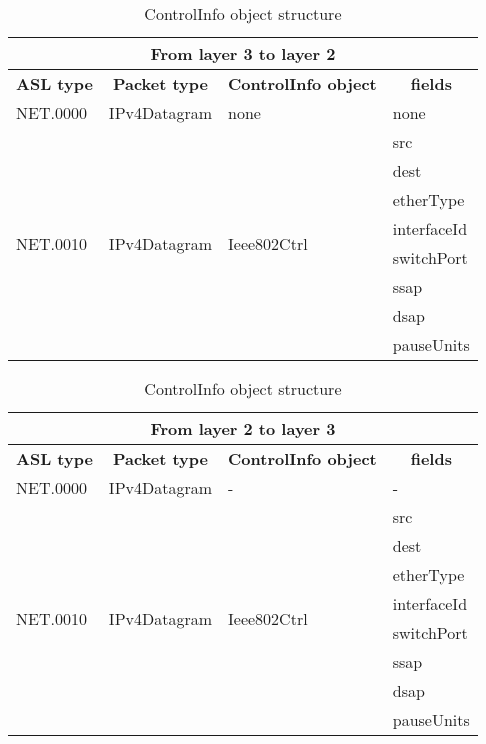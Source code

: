 \begin{table}
\centering
\ttfamily
\footnotesize
\caption{ControlInfo object structure}
\label{tab:from4-to5}
\begin{tabular}{|l|l|l|l|}
\hline
\multicolumn{4}{|c|}{\normalfont\textbf{From layer 3 to layer 2}}	\\
\hline
\multicolumn{1}{|c|}{\normalfont\textbf{ASL type}}	&\multicolumn{1}{c|}{\normalfont\textbf{Packet type}}	&\multicolumn{1}{c|}{\normalfont\textbf{ControlInfo object}}		&\multicolumn{1}{c|}{\normalfont\textbf{fields}}\\
\hline
\multirow{1}{*}{NET.0000}&\multirow{1}{*}{IPv4Datagram}		&none	&none	\\
\hline
\multirow{8}{*}{NET.0010}&\multirow{8}{*}{IPv4Datagram}		&\multirow{8}{*}{Ieee802Ctrl}	&src			\\
												&						&									&dest		\\
												&					&									&etherType	\\
												&					&									&interfaceId	\\
												&					&									&switchPort	\\
												&					&									&ssap		\\
												&					&									&dsap		\\
												&					&									&pauseUnits	\\
\hline
\end{tabular}
\end{table}
%
\begin{table}
\centering
\ttfamily
\footnotesize
\caption{ControlInfo object structure}
\label{tab:from4-to5}
\begin{tabular}{|l|l|l|l|}
\hline
\multicolumn{4}{|c|}{\normalfont\textbf{From layer 2 to layer 3}}	\\
\hline
\multicolumn{1}{|c|}{\normalfont\textbf{ASL type}}	&\multicolumn{1}{c|}{\normalfont\textbf{Packet type}}	&\multicolumn{1}{c|}{\normalfont\textbf{ControlInfo object}}		&\multicolumn{1}{c|}{\normalfont\textbf{fields}}\\
\hline
\multirow{1}{*}{NET.0000}&\multirow{1}{*}{IPv4Datagram}		&-						&-	\\
\hline
\multirow{8}{*}{NET.0010}&\multirow{8}{*}{IPv4Datagram}		&\multirow{8}{*}{Ieee802Ctrl}	&src			\\
												&						&									&dest		\\
												&						&									&etherType	\\
												&						&									&interfaceId	\\
												&						&									&switchPort	\\
												&						&									&ssap		\\
												&						&									&dsap		\\
												&						&									&pauseUnits	\\
\hline
\end{tabular}
\end{table}


